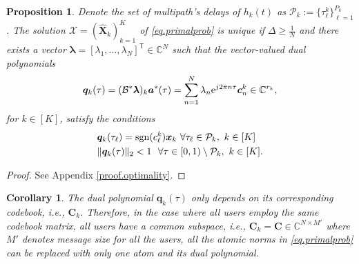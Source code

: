 \documentclass[conference,10pt]{IEEEtran}
\theoremstyle{remark}
\theoremstyle{plain}
\newtheorem{prop}{\textbf{Proposition}}
\newtheorem*{corl}{\textbf{Corollary}}
\theoremstyle{definition}
\theoremstyle{remark}
\begin{document}


\begin{prop}\label{prop.optimality}
Denote the set of multipath's delays of $h_k(t)$ as $\mathcal{P}_k:=\{\tau_{\ell}^k\}_{\ell=1}^{P_k}$. The solution $\widehat{\bm{\mathcal{X}}}=(\widehat{\bm{X}}_k)_{k=1}^K$ of \eqref{eq.primalprob} is unique if  $\Delta \geq \frac{1}{N}$ and there exists a vector $\bm{\lambda}=[\lambda_{1}, \ldots, \lambda_{N}]^{\mathsf{T}}\in\mathbb{C}^N$ such that the vector-valued dual polynomials 
\begin{align}\label{eq.Qi}
\bm{q}_k(\tau)=(\mathcal{B}^*\bm{\lambda})_k\bm{a}^*(\tau)= \sum_{n=1}^{N}\lambda_n {\rm e}^{j2\pi n \tau} \bm{c}_n^k\in\mathbb{C}^{r_k}, 
\end{align}
for $k \in [K]$, satisfy the conditions
\begin{align}
&\bm{q}_k(\tau_{\ell})={\rm sgn}({c_{\ell}^{k}})\bm{x}_k~\forall \tau_{\ell}\in \mathcal{P}_k,~ k\in [K]\label{eq.supp_cond}\\
&\|\bm{q}_k(\tau)\|_2<1~~\forall \tau \in [0,1)\setminus \mathcal{P}_k,~ k\in [K].\label{eq.offsupp_cond}
\end{align}
 \end{prop}
\begin{proof}
See Appendix \ref{proof.optimality}.
\end{proof}




\begin{corl}
The dual polynomial $\bm{q}_k(\tau)$ only depends on its corresponding codebook, i.e.,   $\bm{C}_k$. Therefore, in the case where all users employ the same codebook matrix, all users have a common subspace, i.e., $\bm{C}_k = \bm{C} \in \mathbb{C}^{N\times M'}$ where $M'$ denotes message size for all the users,  all the atomic norms in \eqref{eq.primalprob} can be replaced with only one atom and its dual polynomial. 
\end{corl}            

\end{document}
